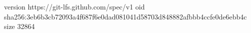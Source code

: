 version https://git-lfs.github.com/spec/v1
oid sha256:3eb6b3cb72093a4f687f6e0dad081041d58703d848882afbbb4ccfe0de6ebb4c
size 32864
